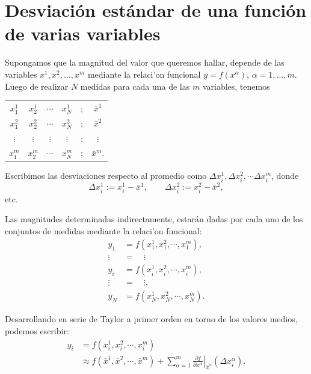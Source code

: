 \chapter{Desviación estándar de una función de varias variables}\label{sec:propdesv}

\newpage

Supongamos que la magnitud del valor que queremos hallar, depende de las variables $x^1, x^2, \dots, x^m$  mediante la relaci'on funcional $y=f(x^\alpha)$, $\alpha=1,\dots,m$. Luego de realizar $N$ medidas para cada una de las $m$ variables, tenemos
\begin{center}
\begin{tabular}{cccccc}
$x^1_1$ & $x^1_2$ & $\cdots$ & $x^1_N$ & ; & $\bar{x}^1$ \\ 
$x^2_1$ & $x^2_2$ & $\cdots$ & $x^2_N$ & ; & $\bar{x}^2$ \\ 
$\vdots$ & $\vdots$ & $\vdots$ & $\vdots$ & ; & $\vdots$ \\ 
$x^m_1$ & $x^m_2$ & $\cdots$ & $x^m_N$ & ; & $\bar{x}^m$.
\end{tabular} 
\end{center}
Escribimos las desviaciones respecto al promedio como $\Delta x^1_i, \Delta x^2_i, \cdots \Delta x^m_i$, donde
\begin{equation}
\Delta x^1_i:=x_i^1-\bar{x}^1, \qquad \Delta x^2_i:=x_i^2-\bar{x}^2,
\end{equation}
etc.

Las magnitudes determinadas indirectamente, estarán dadas por cada uno de los conjuntos de medidas mediante la relaci'on funcional:
\begin{align}
y_1 &= f(x^1_1,x^2_1,\cdots, x^m_1), \\
\vdots &= \quad\vdots  \\
y_i &= f(x^1_i,x^2_i,\cdots, x^m_i),\\
\vdots &= \quad \vdots,  \\
y_N &= f(x^1_N,x^2_N,\cdots, x^m_N).
\end{align}

Desarrollando en serie de Taylor a primer orden en torno de los valores medios, podemos escribir:
\begin{align}
y_i & = f(x^1_i,x^2_i,\cdots, x^m_i)\\
&\approx  f(\bar{x}^1,\bar{x}^2,\cdots, \bar{x}^m)+ \sum_{\alpha=1}^m\left.\frac{\partial f}{\partial x^\alpha}\right|_{\bar{x}^\alpha}(\Delta x^\alpha_i).
\end{align}

